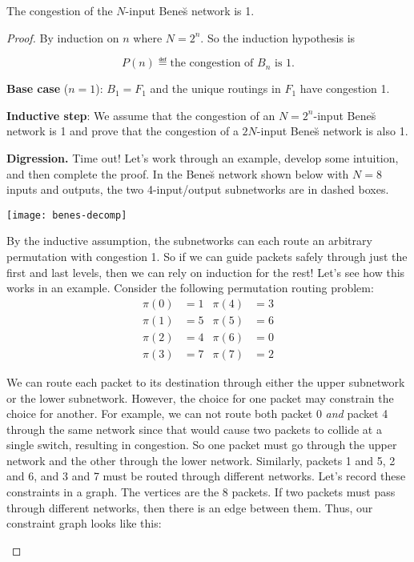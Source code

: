 \begin{theorem}
The congestion of the $N$-input Bene\u{s} network is 1.

\iffalse , where $N = 2^a$ for some $a \geq 1$\fi

\end{theorem}

\begin{proof}
By induction on $n$ where $N=2^n$.  So the induction hypothesis is

\[
P(n) \eqdef  \text{the congestion of $B_n$ is 1}.
\]

\textbf{Base case} ($n=1$): $B_1 =F_1$ and the unique routings in $F_1$
have congestion 1.

\textbf{Inductive step}: We assume that the congestion of an $N=2^n$-input
Bene\u{s} network is 1 and prove that the congestion of a $2N$-input
Bene\u{s} network is also 1.

\textbf{Digression. }  Time out!  Let's work through an example,
develop some intuition, and then complete the proof.  In the Bene\u{s}
network shown below with $N=8$ inputs and outputs, the two
4-input/output subnetworks are in dashed boxes.

\texttt{[image: benes-decomp]}

By the inductive assumption, the subnetworks can each route an
arbitrary permutation with congestion 1.  So if we can guide packets
safely through just the first and last levels, then we can rely on
induction for the rest!  Let's see how this works in an example.
Consider the following permutation routing problem:
%
\begin{align*}
\pi(0) & = 1 & \pi(4) & = 3 \\
\pi(1) & = 5 & \pi(5) & = 6 \\
\pi(2) & = 4 & \pi(6) & = 0 \\
\pi(3) & = 7 & \pi(7) & = 2
\end{align*}

We can route each packet to its destination through either the upper
subnetwork or the lower subnetwork.  However, the choice for one
packet may constrain the choice for another.  For example, we can not
route both packet 0 \textit{and} packet 4 through the same network
since that would cause two packets to collide at a single switch,
resulting in congestion.  So one packet must go through the upper
network and the other through the lower network.  Similarly, packets 1
and 5, 2 and 6, and 3 and 7 must be routed through different networks.
Let's record these constraints in a graph.  The vertices are the 8
packets.  If two packets must pass through different networks, then
there is an edge between them.  Thus, our constraint graph looks like
this:
\begin{center}
\end{center}


\end{proof}

